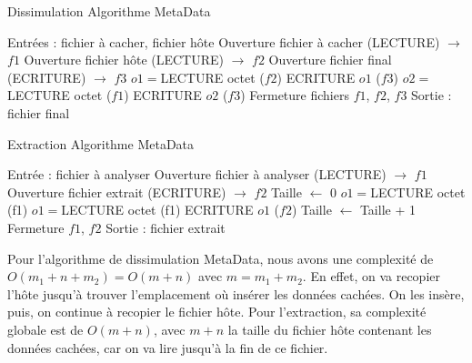 \documentclass[11pt]{article}
\begin{document}
\begin{minipage}{.5\textwidth}
\begin{algorithm}[H]
\caption{Dissimulation Algorithme MetaData}
\begin{algorithmic}
\color{green}
\STATE \footnotesize Entrées : fichier à cacher, fichier hôte
\color{black}
\STATE Ouverture fichier à cacher (LECTURE) $\rightarrow$ $f1$
\STATE Ouverture fichier hôte (LECTURE) $\rightarrow$ $f2$
\STATE Ouverture fichier final (ECRITURE) $\rightarrow$ $f3$
\STATE $o1 = $LECTURE octet ($f2$)
\STATE ECRITURE $o1$ ($f3$)
\STATE $o2 = $LECTURE octet ($f1$)
\STATE ECRITURE $o2$  ($f3$)
\ENDWHILE
\ENDIF
\ENDWHILE
\STATE Fermeture fichiers $f1$, $f2$, $f3$
\color{green}
\STATE Sortie : fichier final
\color{black}
\end{algorithmic}
\end{algorithm}
\normalsize
\end{minipage}
\begin{minipage}{.5\textwidth}
\begin{algorithm}[H]
\caption{Extraction Algorithme MetaData}
\begin{algorithmic}
\color{green}
\STATE \footnotesize Entrée : fichier à analyser
\color{black}
\STATE Ouverture fichier à analyser (LECTURE) $\rightarrow$ $f1$
\STATE Ouverture fichier extrait (ECRITURE) $\rightarrow$ $f2$
\STATE Taille $\leftarrow$ 0
\STATE $o1 = $LECTURE octet (f1)
\STATE $o1 = $LECTURE octet (f1)
\STATE ECRITURE $o1$ ($f2$)
\STATE Taille $\leftarrow$ Taille + 1
\ENDWHILE
\ENDIF
\ENDWHILE
\STATE Fermeture $f1$, $f2$
\color{green}
\STATE Sortie : fichier extrait
\color{black}
\end{algorithmic}
\end{algorithm}
\normalsize
\end{minipage}

Pour l'algorithme de dissimulation MetaData, nous avons une complexité de 
$O(m_1+n+m_2)=O(m+n)$ avec $m=m_1+m_2$. En effet, on va recopier l'hôte 
jusqu'à trouver l'emplacement où insérer les données cachées. On les insère, puis, on 
continue à recopier le fichier hôte. \newline
Pour l'extraction, sa complexité globale est de $O(m+n)$, avec $m+n$ la taille 
du fichier hôte contenant les données cachées, car on va lire jusqu'à 
la fin de ce fichier. 
\end{document}
